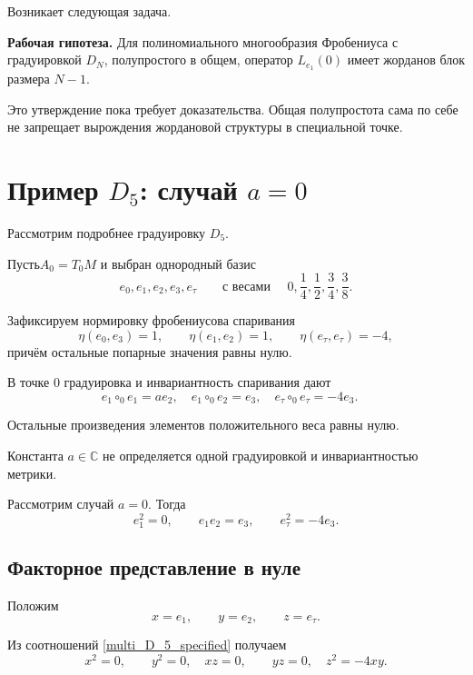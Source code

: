Возникает следующая задача.

\medskip

\noindent
\textbf{Рабочая гипотеза.}
Для полиномиального многообразия Фробениуса
с градуировкой $D_N$, полупростого в общем,
оператор $L_{e_1}(0)$ имеет жорданов блок
размера $N-1$.

\medskip

Это утверждение пока требует доказательства.
Общая полупростота сама по себе не запрещает
вырождения жордановой структуры в специальной
точке.
\fi
\section{Пример $D_5$: случай $a=0$}

Рассмотрим подробнее градуировку $D_5$.

Пусть\(A_0=T_0M\)
и выбран однородный базис
\[e_0,e_1,e_2,e_3,e_\tau
\qquad
\text{с весами } \quad
0,\frac14,\frac12,\frac34,\frac38.\]

Зафиксируем нормировку фробениусова
спаривания
\[\eta(e_0,e_3)=1,
\qquad
\eta(e_1,e_2)=1,
\qquad
\eta(e_\tau,e_\tau)=-4,\]
причём остальные попарные значения равны нулю.

В точке $0$ градуировка и инвариантность
спаривания дают
\begin{equation}
e_1\circ_0e_1=ae_2,\quad
e_1\circ_0e_2=e_3,\quad
e_\tau\circ_0e_\tau=-4e_3.\quad
\label{multi_D_5}
\end{equation}

Остальные произведения элементов положительного
веса равны нулю.

Константа $a \in \mathbb{C}$ не определяется
одной градуировкой и инвариантностью метрики.

Рассмотрим случай
\(a=0.\)
Тогда
\begin{equation}
e_1^2=0,
\qquad
e_1e_2=e_3,
\qquad
e_\tau^2=-4e_3.
\label{multi_D_5_specified}
\end{equation}

\subsection{Факторное представление в нуле}

Положим
\[
x=e_1,\qquad
y=e_2,\qquad
z=e_\tau.
\]

Из соотношений \ref{multi_D_5_specified} получаем
\begin{equation}
x^2=0,\qquad y^2=0,\quad
xz=0,\qquad yz=0, \quad
z^2=-4xy.
\end{equation}

